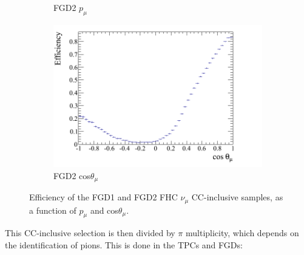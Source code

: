 \begin{figure}
\begin{subfigure}{.48\textwidth}
  \caption{FGD2 $p_{\mu}$}
\end{subfigure}
\begin{subfigure}{.48\textwidth}
  \centering
  \includegraphics[width=0.95\linewidth]{figs/effcosfgd2numu}
  \caption{FGD2 cos$\theta_{\mu}$}
\end{subfigure}
\caption{Efficiency of the FGD1 and FGD2 FHC $\nu_{\mu}$ CC-inclusive samples, as a function of $p_{\mu}$ and cos$\theta_{\mu}$.}
\label{fig:numueff}
\end{figure}

This CC-inclusive selection is then divided by $\pi$ multiplicity, which depends on the identification of pions. This is done in the TPCs and FGDs:

